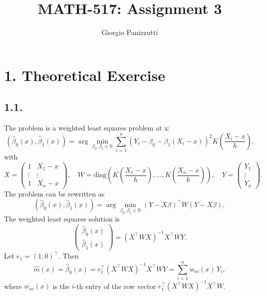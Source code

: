 \documentclass[11pt]{article}
\title{MATH-517: Assignment 3}
\author{Giorgio Panizzutti}
\date{}
\begin{document}
\maketitle


\section*{1. Theoretical Exercise}
\subsection*{1.1.}
The problem is a weighted least squares problem at x:
\[
(\hat\beta_0(x),\hat\beta_1(x))
=\arg\min_{\beta_0,\beta_1\in\mathbb{R}}
\sum_{i=1}^n \left(Y_i-\beta_0-\beta_1(X_i-x)\right)^2
K\left(\frac{X_i-x}{h}\right).
\]
with
\[
X=\begin{pmatrix}
1 & X_1-x\\
\vdots & \vdots\\
1 & X_n-x
\end{pmatrix},\quad
W=\mathrm{diag}(K\left(\frac{X_1-x}{h}\right),\ldots,K\left(\frac{X_n-x}{h}\right)),\quad
Y=\begin{pmatrix}Y_1\\ \vdots\\ Y_n\end{pmatrix}.
\]
The problem can be rewritten as
\[
(\hat\beta_0(x),\hat\beta_1(x))
=\arg\min_{\beta_0,\beta_1\in\mathbb{R}}
(Y-X\beta)^{\top}W(Y-X\beta),
\]
The weighted least squares solution is
\[
\begin{pmatrix}\hat\beta_0(x)\\ \hat\beta_1(x)\end{pmatrix}
=(X^{\top}WX)^{-1}X^{\top}WY.
\]
Let \(e_1=(1,0)^{\top}\). Then
\[
\hat m(x)=\hat\beta_0(x)=e_1^{\top}(X^{\top}WX)^{-1}X^{\top}WY
=\sum_{i=1}^n w_{ni}(x)\,Y_i,
\]
where \(w_{ni}(x)\) is the \(i\)-th entry of the row vector \(e_1^{\top}(X^{\top}WX)^{-1}X^{\top}W\).
\end{document}

